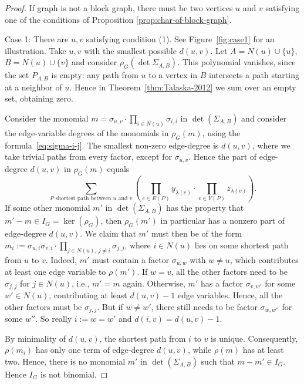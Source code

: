 \documentclass[a4paper, 11pt]{amsart}
\numberwithin{theorem}{section}
\begin{document}
\begin{proof}
    If graph is not a block graph, there must be two vertices $u$ and $v$ satisfying one of the conditions of Proposition \ref{prop:char-of-block-graph}.

    Case 1: There are $u,v$ satisfying condition (1). See
    Figure~\ref{fig:case1} for an illustration. Take $u,v$ with the
    smallest possible $d(u,v)$. Let $A = N(u)\cup \lbrace u\rbrace$,
    $B=N(u) \cup \lbrace v\rbrace$ and consider
    $\rho_G(\det\Sigma_{A,B})$.
    This polynomial vanishes, since the set $P_{A,B}$ is empty: any
    path from $u$ to a vertex in $B$ intersects a path starting at a
    neighbor of $u$. Hence in Theorem~\ref{thm:Talaska-2012} we sum over an empty set, obtaining zero.

    Consider the monomial $m=\sigma_{u,v}\cdot \prod_{i \in N(u)}
    \sigma_{i,i}$ in $\det(\Sigma_{A,B})$ and consider the edge-variable degrees of the monomials in
    $\rho_G(m)$, using the formula~\eqref{eq:sigma-i-j}. The smallest
    non-zero edge-degree is $d(u,v)$, where we take trivial paths from
    every factor, except for $\sigma_{u,v}$. Hence the part of
    edge-degree $d(u,v)$ in $\rho_G(m)$ equals 
    $$
        \sum_{P\text{ shortest path between $u$ and $v$}}\left( \prod_{e\in E(P)} y_{\lambda(e)}\cdot \prod_{v\in V(P)} z_{\lambda(v)}\right).
    $$
    If some other monomial $m'$ in $\det(\Sigma_{A,B})$ has the property
    that $m'-m \in I_G=\ker(\rho_G)$, then $\rho_G(m')$ in particular
    has a nonzero part of edge-degree $d(u,v)$. We claim that $m'$
    must then be of the form $m_{i}:=\sigma_{u,i}\sigma_{v,i}\cdot
    \prod_{j\in N(u),\, j\neq i}\sigma_{j,j}$, where $i\in N(u)$
    lies on some shortest path from $u$ to $v$. Indeed, $m'$ must
    contain a factor $\sigma_{u,w}$ with $w\neq u$, which contributes
    at least one edge variable to $\rho(m')$. If $w=v$, all the other
    factors need to be $\sigma_{j,j}$ for $j\in N(u)$, i.e., $m'=m$
    again. Otherwise, $m'$ has a factor $\sigma_{v,w'}$ for some $w'
    \in N(u)$, contributing at least $d(u,v)-1$ edge variables. Hence,
    all the other factors must be $\sigma_{j,j}$. But if $w\neq w'$,
    there still needs to be factor $\sigma_{w,w''}$ for some $w''$. So
    really $i:=w=w'$ and $d(i,v) = d(u,v)-1$.

    By minimality of $d(u,v)$, the shortest path from $i$ to $v$
    is unique. Consequently, $\rho(m_{i})$
    has only one term of edge-degree $d(u,v)$, while $\rho(m)$ has at
    least two. Hence, there is no monomial $m'$ in $\det(\Sigma_{A,B})$
    such that $m-m' \in I_G$. Hence $I_G$ is not binomial.


\end{proof}
\end{document}
